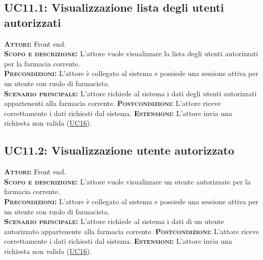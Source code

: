 \subsection{UC11.1: Visualizzazione lista degli utenti autorizzati}
\label{sec:UC111}
\textsc{\textbf{Attori:}} Front end.\\
\textsc{\textbf{Scopo e descrizione:}} L'attore vuole visualizzare la lista degli utenti autorizzati per la farmacia corrente.\\
\textsc{\textsc{\textbf{Precondizioni:}}} L'attore è collegato al sistema e possiede una sessione attiva per un utente con ruolo di farmacista.\\
\textsc{\textbf{Scenario principale:}} L'attore richiede al sistema i dati degli utenti autorizzati appartenenti alla farmacia corrente.
\textsc{\textbf{Postcondizioni:}} L'attore riceve correttamente i dati richiesti dal sistema.
\textsc{\textbf{Estensioni:}} L'attore invia una richiesta non valida (\hyperref[sec:UC16]{UC16}).

\subsection{UC11.2: Visualizzazione utente autorizzato}
\label{sec:UC112}
\textsc{\textbf{Attori:}} Front end.\\
\textsc{\textbf{Scopo e descrizione:}} L'attore vuole visualizzare un utente autorizzate per la farmacia corrente.\\
\textsc{\textsc{\textbf{Precondizioni:}}} L'attore è collegato al sistema e possiede una sessione attiva per un utente con ruolo di farmacista.\\
\textsc{\textbf{Scenario principale:}} L'attore richiede al sistema i dati di un utente autorizzato appartenente alla farmacia corrente.
\textsc{\textbf{Postcondizioni:}} L'attore riceve correttamente i dati richiesti dal sistema.
\textsc{\textbf{Estensioni:}} L'attore invia una richiesta non valida (\hyperref[sec:UC16]{UC16}).

